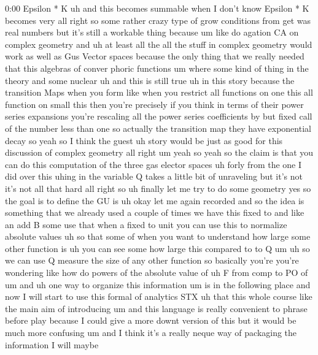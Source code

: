 \begin{unfinished}{0:00}
Epsilon  *  K  uh  and  this  becomes  summable
when  I  don't  know  Epsilon  *  K  becomes
very  all  right  so  some  rather  crazy  type
of  grow  conditions  from  get  was  real
numbers  but  it's  still  a  workable  thing
because
um  like  do  agation  CA  on  complex
geometry
and  uh  at  least  all  the  all  the  stuff  in
complex  geometry  would  work  as  well  as
Gus  Vector  spaces  because  the  only  thing
that  we  really  needed  that  this  algebras
of  conver  phoric
functions
um  where  some  kind  of  thing  in  the
theory  and  some  nuclear  uh  and  this  is
still  true  uh  in  this
story  because  the  transition  Maps  when
you
form  like  when  you  restrict  all
functions  on  one  this  all  function  on
small  this  then  you're  precisely  if  you
think  in  terms  of  their  power  series
expansions  you're  rescaling  all  the
power  series  coefficients  by  but  fixed
call  of  the  number  less  than  one  so
actually  the  transition  map  they  have
exponential
decay
so  yeah  so  I  think  the
guest  uh  story  would  be  just  as  good  for
this  discussion  of  complex
geometry  all  right
um  yeah
so  yeah  so  the  claim  is  that  you  can  do
this  computation  of  the  three  gas
elector  spaces  uh  forly  from  the  one  I
did  over  this
uhing  in  the  variable
Q  takes  a  little  bit  of  unraveling  but
it's  not  it's  not  all  that
hard  all  right  so  uh  finally  let  me  try
to  do  some
geometry
yes  so  the  goal  is  to
define
the  GU  is
uh  okay  let  me  again
recorded
and  so  the  idea  is  something  that  we
already  used  a  couple  of
times  we  have  this
fixed  to
and  like  an  add  B  some  use  that  when  a
fixed  to  unit  you  can  use  this  to
normalize  absolute  values  uh  so  that
some  of  when  you  want  to  understand  how
large  some  other  function  is  uh  you  can
see  some  how  large  this  compared  to  to  Q
um  uh  so  we  can  use
Q
measure  the  size  of  any  other
function  so  basically  you're  you're
wondering
like  how  do  powers  of  the  absolute  value
of  uh  F  from  comp  to  PO
of
um  and  uh  one  way  to  organize  this
information  um  is  in  the  following
place
and  now  I  will  start  to  use  this  formal
of  analytics  STX  uh  that  this  whole
course  like  the  main  aim  of  introducing
um  and  this  language  is  really
convenient  to  phrase  before  play  because
I  could  give  a  more  downt  version  of
this  but  it  would  be  much  more  confusing
um
and  I  think  it's  a  really  neque  way  of
packaging  the  information  I  will  maybe

\end{unfinished}
